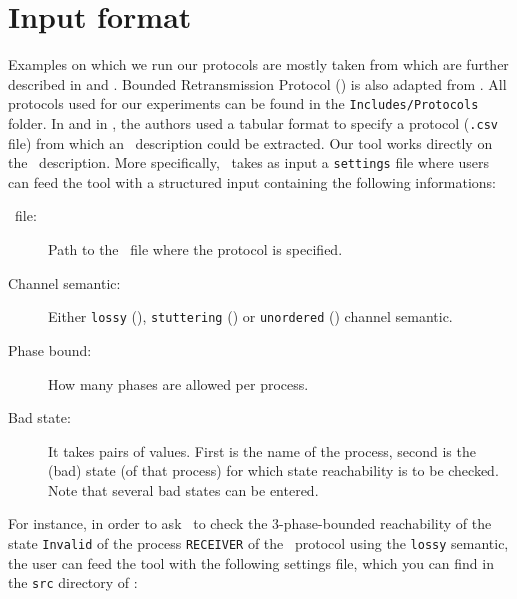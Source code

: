 \section{Input format}
\label{sec:input}

Examples on which we run our protocols are mostly taken from \cite{JRSVgit} 
which are further described in \cite{MPSV11} and \cite{RSV11}.
Bounded Retransmission Protocol (\Brp) is also adapted from \cite{AABJ04}.
All protocols used for our experiments can be found in the \texttt{Includes/Protocols} folder.
%
In \cite{JRSVgit} and in \alternator, the authors used a tabular format to specify a protocol (\texttt{.csv} file)
from which an \Xml\ description could be extracted.
Our tool works directly on the \Xml\ description.
%
More specifically, \MPass\ takes as input a \texttt{settings} file where users can feed the tool with a structured input containing the following informations:

\begin{description}
\item[\Xml\ file:] Path to the \Xml\ file where the protocol is specified.
\item[Channel semantic:] Either \texttt{lossy} (\Lcs), \texttt{stuttering} (\Slcs) or \texttt{unordered} (\Ucs) channel semantic.
\item[Phase bound:] How many phases are allowed per process.
\item[Bad state:] It takes pairs of values.
%
First is the name of the process,  second is the (bad) state (of that process) for which state reachability is to be checked.
%
Note that several bad states can be entered.
\end{description}

For instance, in order to ask \MPass\ to check the $3$-phase-bounded reachability
of the state \texttt{Invalid} of the process \texttt{RECEIVER} of the \Brp\ protocol
using the \texttt{lossy} semantic,
the user can feed the tool with the following settings file, which you can find in the \texttt{src} directory of \MPass:

